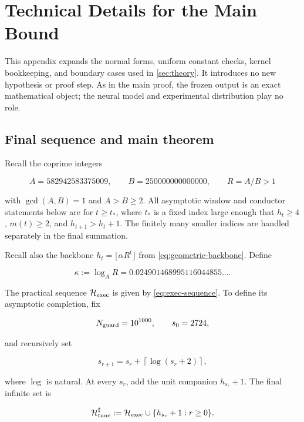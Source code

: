 \section{Technical Details for the Main Bound}
\label{app:full-proof}

This appendix expands the normal forms, uniform constant checks, kernel
bookkeeping, and boundary cases used in \cref{sec:theory}.  It introduces no
new hypothesis or proof step.  As in the main proof, the frozen output is an
exact mathematical object; the neural model and experimental distribution play
no role.

\subsection{Final sequence and main theorem}

Recall the coprime integers

\[
  A=582942583375009,\qquad B=250000000000000,\qquad
  R=A/B>1
\]

with $\gcd(A,B)=1$ and $A>B\ge2$.  All asymptotic window and conductor
statements below are for $t\ge t_*$, where $t_*$ is a fixed index large enough
that $h_t\ge4$, $m(t)\ge2$, and $h_{t+1}>h_t+1$.  The finitely many smaller
indices are handled separately in the final summation.

Recall also the backbone $h_t=\lfloor\alpha R^t\rfloor$ from
\cref{eq:geometric-backbone}.  Define

\begin{equation}
  \kappa:=\log_A R
  =0.024901468995116044855\ldots.
  \label{eq:kappa}
\end{equation}

The practical sequence $\mathcal H_{\rm exec}$ is given by
\cref{eq:exec-sequence}.  To define its asymptotic completion, fix

\[
  N_{\rm guard}=10^{1000},\qquad s_0=2724,
\]

and recursively set

\begin{equation}
  s_{r+1}=s_r+\left\lceil\log(s_r+2)\right\rceil,
  \label{eq:companion-indices}
\end{equation}

where $\log$ is natural.  At every $s_r$, add the unit companion
$h_{s_r}+1$.  The final infinite set is

\begin{equation}
  \mathcal H^\sharp_{\rm tune}
  :=\mathcal H_{\rm exec}
    \cup\{h_{s_r}+1:r\ge0\}.
  \label{eq:completed-sequence}
\end{equation}

